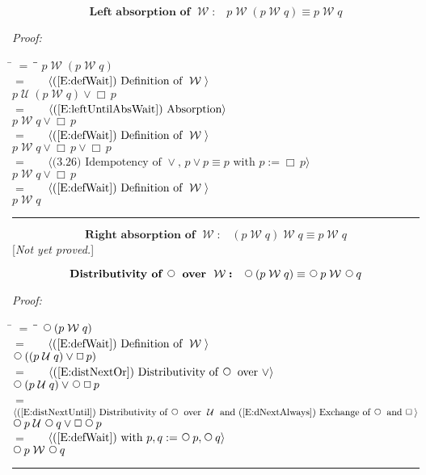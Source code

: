 \documentclass[fleqn, leqno]{article}
\newcommand{\lgap}{2pt}                             %
\newcommand{\mymathindent}{24pt}                    %
\newcommand{\Until}{\;\mathcal{U}\;}
\newcommand{\Wait}{\;\mathcal{W}\;}
\newcommand{\Next}{\;\,\text{\raisebox{3.5pt}{\circle{6}}}}
\newcommand{\Always}{\Box\,}
\newcommand{\myqed}{\rule[-.23ex]{1.2ex}{2.0ex}}
\newcommand{\myqedtab}{\hspace{388.5pt}}              %
\newcommand{\Gll} {\langle}                         %
\newcommand{\Ggg} {\rangle}                         %
\newcommand{\Hint}[1]     {\ \ \ $\Gll              \mbox{#1} \Ggg$ }   %
\begin{document}
\begin{equation}\label{E:waitAbsL}
\textbf{Left absorption of $\Wait$:}\quad p \Wait (p \Wait q) \equiv p \Wait q
\end{equation}

\emph{Proof:}
\begin{tabbing}
\hspace{\mymathindent} \= $= \;$ \= \myqedtab \= \kill
\> \> $p \Wait (p \Wait q)$\\[\lgap]
\> $=$ \> \Hint{(\ref{E:defWait}) Definition of $\Wait$} \\[\lgap]
\> \> $p \Until (p \Wait q) \lor \Always p$\\[\lgap]
\> $=$ \> \Hint{(\ref{E:leftUntilAbsWait}) Absorption} \\[\lgap]
\> \> $p \Wait q \lor \Always p$\\[\lgap]
\> $=$ \> \Hint{(\ref{E:defWait}) Definition of $\Wait$} \\[\lgap]
\> \> $p \Wait q \lor \Always p \lor \Always p$\\[\lgap]
\> $=$ \> \Hint{(3.26) Idempotency of $\lor$, $p \lor p \equiv p$ with $p := \Always p$} \\[\lgap]
\> \> $p \Wait q \lor \Always p$\\[\lgap]
\> $=$ \> \Hint{(\ref{E:defWait}) Definition of $\Wait$} \\[\lgap]
\> \> $p \Wait q$ \> \myqed
\end{tabbing}

\begin{equation}\label{E:waitAbsR}
\textbf{Right absorption of $\Wait$:}\quad (p \Wait q) \Wait q \equiv p \Wait q
\end{equation}
[\textit{Not yet proved.}]

\begin{equation}\label{E:waitNextDist}
\textbf{Distributivity of $\Next$ over $\Wait$:}\quad \Next (p \Wait q) \equiv \Next p \Wait \Next q
\end{equation}

\emph{Proof:}
\begin{tabbing}
\hspace{\mymathindent} \= $= \;$ \= \myqedtab \= \kill
\> \> $\Next (p \Wait q)$\\[\lgap]
\> $=$ \> \Hint{(\ref{E:defWait}) Definition of $\Wait$} \\[\lgap]
\> \> $\Next((p\Until q)\lor \Always p)$\\[\lgap]
\> $=$ \> \Hint{(\ref{E:distNextOr}) Distributivity of $\Next$ over $\lor$} \\[\lgap]
\> \> $\Next(p\Until q)\lor \Next \Always p$\\[\lgap]
\> $=$ \> \Hint{(\ref{E:distNextUntil}) Distributivity of $\Next$ over $\Until$ and (\ref{E:dNextAlways}) Exchange of $\Next$ and $\Always$} \\[\lgap]
\> \> $\Next p\Until \Next q\lor \Always \Next p$\\[\lgap]
\> $=$ \> \Hint{(\ref{E:defWait}) with $p,q := \Next p, \Next q$} \\[\lgap]
\> \> $\Next p \Wait \Next q$ \> \myqed
\end{tabbing}
\end{document}
